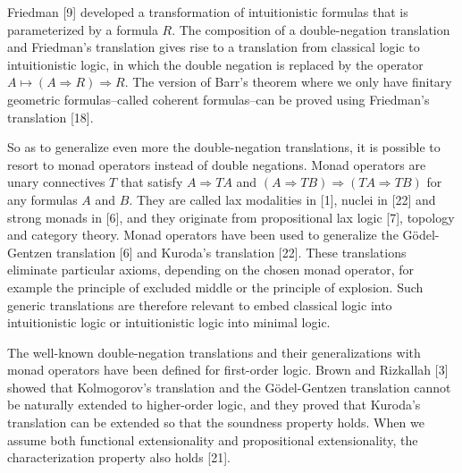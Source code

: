 \documentclass[10pt,a4paper]{article}
\begin{document}
 
 
Friedman [9] developed a transformation of intuitionistic formulas that is parameterized by a formula $R$. The composition of a double-negation translation and Friedman’s translation gives rise to a translation from classical logic to intuitionistic logic, in which the double negation is replaced by the operator $A\mapsto(A\mathbin{\Rightarrow}R)\mathbin{\Rightarrow}R$. The version of Barr’s theorem where we only have finitary geometric formulas–called coherent formulas–can be proved using Friedman’s translation [18].\par
 
 
 
So as to generalize even more the double-negation translations, it is possible to resort to monad operators instead of double negations. Monad operators are unary connectives $T$ that satisfy $A\mathbin{\Rightarrow}TA$ and $(A\mathbin{\Rightarrow}TB)\mathbin{\Rightarrow}(TA\mathbin{\Rightarrow}TB)$ for any formulas $A$ and $B$. They are called lax modalities in [1], nuclei in [22] and strong monads in [6], and they originate from propositional lax logic [7], topology and category theory. Monad operators have been used to generalize the Gödel-Gentzen translation [6] and Kuroda’s translation [22]. These translations eliminate particular axioms, depending on the chosen monad operator, for example the principle of excluded middle or the principle of explosion. Such generic translations are therefore relevant to embed classical logic into intuitionistic logic or intuitionistic logic into minimal logic.\par
 
 
 
The well-known double-negation translations and their generalizations with monad operators have been defined for first-order logic. Brown and Rizkallah [3] showed that Kolmogorov’s translation and the Gödel-Gentzen translation cannot be naturally extended to higher-order logic, and they proved that Kuroda’s translation can be extended so that the soundness property holds. When we assume both functional extensionality and propositional extensionality, the characterization property also holds [21].\par
 
 
 
\end{document}
